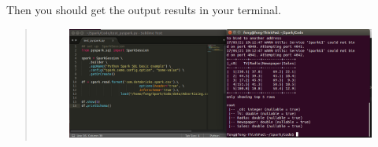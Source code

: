\documentclass[letterpaper,11pt,english]{sphinxmanual}
\begin{document}
Then you should get the output results in your terminal.
\begin{quote}
\begin{figure}[htbp]
\centering

\includegraphics{sublimeWithPySpark.png}
\label{setup:fig-sublimewithpyspark}\end{figure}
\end{quote}
\end{document}
